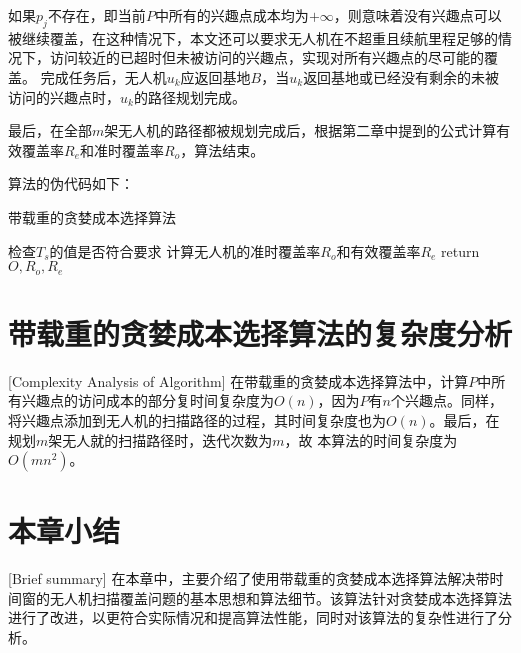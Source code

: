 如果$p_j$不存在，即当前$P$中所有的兴趣点成本均为$+\infty$，则意味着没有兴趣点可以被继续覆盖，在这种情况下，本文还可以要求无人机在不超重且续航里程足够的情况下，访问较近的已超时但未被访问的兴趣点，实现对所有兴趣点的尽可能的覆盖。
完成任务后，无人机$u_k$应返回基地$B$，当$u_k$返回基地或已经没有剩余的未被访问的兴趣点时，$u_k$的路径规划完成。


最后，在全部$m$架无人机的路径都被规划完成后，根据第二章中提到的公式计算有效覆盖率$R_e$和准时覆盖率$R_o$，算法结束。


算法的伪代码如下：
 
\begin{algorithm}[H]  %
	\caption{带载重的贪婪成本选择算法}%
	\LinesNumbered %
	检查$T_s$的值是否符合要求\; %
	计算无人机的准时覆盖率$R_o$和有效覆盖率$R_e$\;
	return $O,R_o,R_e$
\end{algorithm}


\section{带载重的贪婪成本选择算法的复杂度分析}[Complexity Analysis of Algorithm]
在带载重的贪婪成本选择算法中，计算$P$中所有兴趣点的访问成本的部分复时间复杂度为$O(n)$，因为$P$有$n$个兴趣点。同样，将兴趣点添加到无人机的扫描路径的过程，其时间复杂度也为$O(n)$。最后，在规划$m$架无人就的扫描路径时，迭代次数为$m$，故
本算法的时间复杂度为$O(mn^2)$。


\section{本章小结}[Brief summary]
在本章中，主要介绍了使用带载重的贪婪成本选择算法解决带时间窗的无人机扫描覆盖问题的基本思想和算法细节。该算法针对贪婪成本选择算法进行了改进，以更符合实际情况和提高算法性能，同时对该算法的复杂性进行了分析。